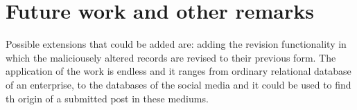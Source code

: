 	\section{Future work and other remarks}
		Possible extensions that could be added are: adding the revision functionality in which the maliciousely altered records are revised to their previous form. The application of the work is endless and it ranges from ordinary relational database of an enterprise, to the databases of the social media and it could be used to find th origin of a submitted post in these mediums.